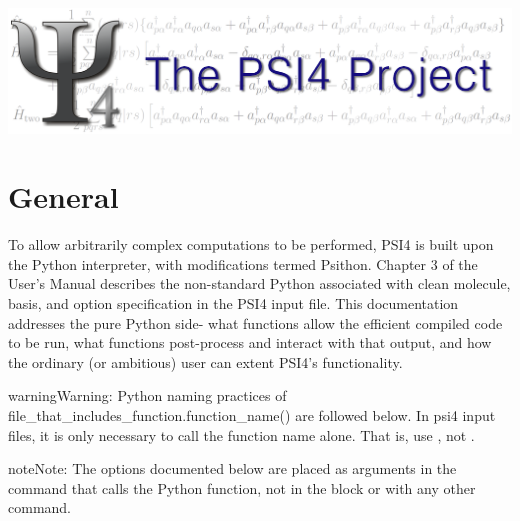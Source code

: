 \documentclass[letterpaper,10pt,english]{sphinxmanual}
\begin{document}
\includegraphics[width=1.000\linewidth]{PSI4_3.png}


\chapter{General}
\label{index::doc}\label{index:general}
To allow arbitrarily complex computations to be performed, PSI4 is built
upon the Python interpreter, with modifications termed Psithon. Chapter 3
of the User's Manual describes the non-standard Python associated with
clean molecule, basis, and option specification in the PSI4 input file.
This documentation addresses the pure Python side- what functions allow
the efficient compiled code to be run, what functions post-process and
interact with that output, and how the ordinary (or ambitious) user can
extent PSI4's functionality.

\begin{notice}{warning}{Warning:}
Python naming practices of file\_that\_includes\_function.function\_name()
are followed below. In psi4 input files, it is only necessary to call the
function name alone. That is, use , not .
\end{notice}

\begin{notice}{note}{Note:}
The options documented below are placed as arguments in the command that
calls the Python function, not in the  block or with any
other  command.
\end{notice}
\end{document}
